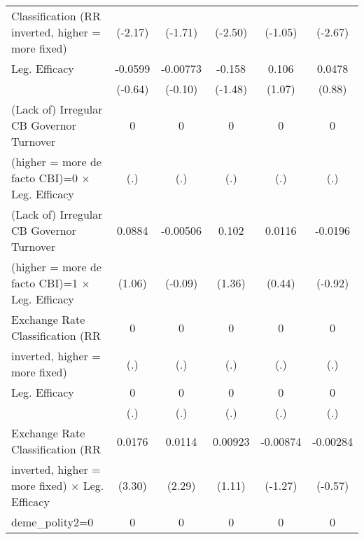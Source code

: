\begin{table}[htbp]
\begin{tabular}{l*{5}{c}}
Classification (RR inverted, higher = more fixed)&  (-2.17)         &  (-1.71)         &  (-2.50)         &  (-1.05)         &  (-2.67)         \\
\addlinespace
Leg. Efficacy                           &  -0.0599         & -0.00773         &   -0.158         &    0.106         &   0.0478         \\
                                        &  (-0.64)         &  (-0.10)         &  (-1.48)         &   (1.07)         &   (0.88)         \\
\addlinespace
(Lack of) Irregular CB Governor Turnover&        0         &        0         &        0         &        0         &        0         \\
(higher = more de facto CBI)=0 $\times$ Leg. Efficacy&      (.)         &      (.)         &      (.)         &      (.)         &      (.)         \\
\addlinespace
(Lack of) Irregular CB Governor Turnover&   0.0884         & -0.00506         &    0.102         &   0.0116         &  -0.0196         \\
(higher = more de facto CBI)=1 $\times$ Leg. Efficacy&   (1.06)         &  (-0.09)         &   (1.36)         &   (0.44)         &  (-0.92)         \\
\addlinespace
Exchange Rate Classification (RR        &        0         &        0         &        0         &        0         &        0         \\
inverted, higher = more fixed)          &      (.)         &      (.)         &      (.)         &      (.)         &      (.)         \\
\addlinespace
Leg. Efficacy                           &        0         &        0         &        0         &        0         &        0         \\
                                        &      (.)         &      (.)         &      (.)         &      (.)         &      (.)         \\
\addlinespace
Exchange Rate Classification (RR        &   0.0176\sym{**} &   0.0114\sym{*}  &  0.00923         & -0.00874         & -0.00284         \\
inverted, higher = more fixed) $\times$ Leg. Efficacy&   (3.30)         &   (2.29)         &   (1.11)         &  (-1.27)         &  (-0.57)         \\
\addlinespace
deme\_polity2=0                          &        0         &        0         &        0         &        0         &        0         \\

\end{tabular}
\end{table}
